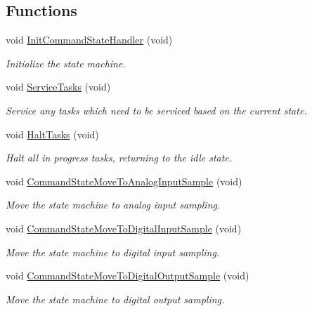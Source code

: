 \subsection*{Functions}
\begin{DoxyCompactItemize}
\item 
void \hyperlink{group__command__state_gabab5afe3159f634f822ad1bccd70209a}{Init\-Command\-State\-Handler} (void)
\begin{DoxyCompactList}\small\item\em Initialize the state machine. \end{DoxyCompactList}\item 
void \hyperlink{group__command__state_gabe3abf44cdbfe8382df3906f5e192626}{Service\-Tasks} (void)
\begin{DoxyCompactList}\small\item\em Service any tasks which need to be serviced based on the current state. \end{DoxyCompactList}\item 
void \hyperlink{group__command__state_ga7ffd79ad6c6165445ae5f0f29bd92d83}{Halt\-Tasks} (void)
\begin{DoxyCompactList}\small\item\em Halt all in progress tasks, returning to the idle state. \end{DoxyCompactList}\item 
void \hyperlink{group__command__state_ga517067b49452b8a3e1e87831720b573b}{Command\-State\-Move\-To\-Analog\-Input\-Sample} (void)
\begin{DoxyCompactList}\small\item\em Move the state machine to analog input sampling. \end{DoxyCompactList}\item 
void \hyperlink{group__command__state_ga95ad2a64f10746852d523bed46b0d328}{Command\-State\-Move\-To\-Digital\-Input\-Sample} (void)
\begin{DoxyCompactList}\small\item\em Move the state machine to digital input sampling. \end{DoxyCompactList}\item 
void \hyperlink{group__command__state_gae7be822d5262fbf48e51ffae98733aec}{Command\-State\-Move\-To\-Digital\-Output\-Sample} (void)
\begin{DoxyCompactList}\small\item\em Move the state machine to digital output sampling. \end{DoxyCompactList}\item 

\end{DoxyCompactItemize}
